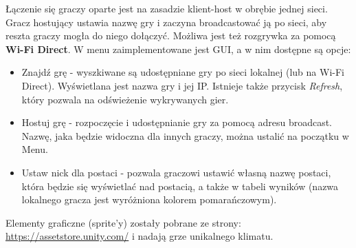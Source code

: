 \documentclass[]{report}
\begin{document}
Łączenie się graczy oparte jest na zasadzie klient-host w obrębie jednej sieci. Gracz hostujący ustawia nazwę gry i zaczyna broadcastować ją po sieci, aby reszta graczy mogła do niego dołączyć. Możliwa jest też rozgrywka za pomocą \textbf{Wi-Fi Direct}. W menu zaimplementowane jest GUI, a w nim dostępne są opcje:
\begin{itemize}
	\item Znajdź grę - wyszkiwane są udostępniane gry po sieci lokalnej (lub na Wi-Fi Direct). Wyświetlana jest nazwa gry i jej IP. Istnieje także przycisk \textit{Refresh}, który pozwala na odświeżenie wykrywanych gier.
	\item Hostuj grę - rozpoczęcie i udostępnianie gry za pomocą adresu broadcast. Nazwę, jaka będzie widoczna dla innych graczy, można ustalić na początku w Menu.
	\item Ustaw nick dla postaci - pozwala graczowi ustawić własną nazwę postaci, która będzie się wyświetlać nad postacią, a także w tabeli wyników (nazwa lokalnego gracza jest wyróżniona kolorem pomarańczowym).
\end{itemize}
Elementy graficzne (sprite'y) zostały pobrane ze strony: 
\href{https://assetstore.unity.com/}{https://assetstore.unity.com/} i nadają grze unikalnego klimatu.
\bigskip
\end{document}
